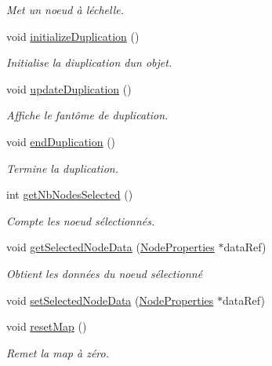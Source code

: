 \begin{DoxyCompactItemize}
\begin{DoxyCompactList}\small\item\em Met un noeud à l\textquotesingle{}échelle. \end{DoxyCompactList}\item 
void \hyperlink{group__inf2990_ga6f50ec221ffc9a37a80fc87b9241000e}{initialize\+Duplication} ()
\begin{DoxyCompactList}\small\item\em Initialise la diuplication d\textquotesingle{}un objet. \end{DoxyCompactList}\item 
void \hyperlink{group__inf2990_ga1a3e0ca25ffb4442968ce0977ca37d45}{update\+Duplication} ()
\begin{DoxyCompactList}\small\item\em Affiche le fantôme de duplication. \end{DoxyCompactList}\item 
void \hyperlink{group__inf2990_ga236c0dba051c913078932ea1cf4a2e76}{end\+Duplication} ()
\begin{DoxyCompactList}\small\item\em Termine la duplication. \end{DoxyCompactList}\item 
int \hyperlink{group__inf2990_gac85e226dae7761e7e98e0df151c5a766}{get\+Nb\+Nodes\+Selected} ()
\begin{DoxyCompactList}\small\item\em Compte les noeud sélectionnés. \end{DoxyCompactList}\item 
void \hyperlink{group__inf2990_ga7dfe6c0df984dd4d2c5402d9fab0fc75}{get\+Selected\+Node\+Data} (\hyperlink{struct_node_properties}{Node\+Properties} $\ast$data\+Ref)
\begin{DoxyCompactList}\small\item\em Obtient les données du noeud sélectionné \end{DoxyCompactList}\item 
void \hyperlink{group__inf2990_gae40b907a6c30f55176cde6b1736eaf72}{set\+Selected\+Node\+Data} (\hyperlink{struct_node_properties}{Node\+Properties} $\ast$data\+Ref)
\item 
void \hyperlink{group__inf2990_gace5ff9435d6bcf501298d401207733bf}{reset\+Map} ()
\begin{DoxyCompactList}\small\item\em Remet la map à zéro. \end{DoxyCompactList}\item 

\end{DoxyCompactItemize}
